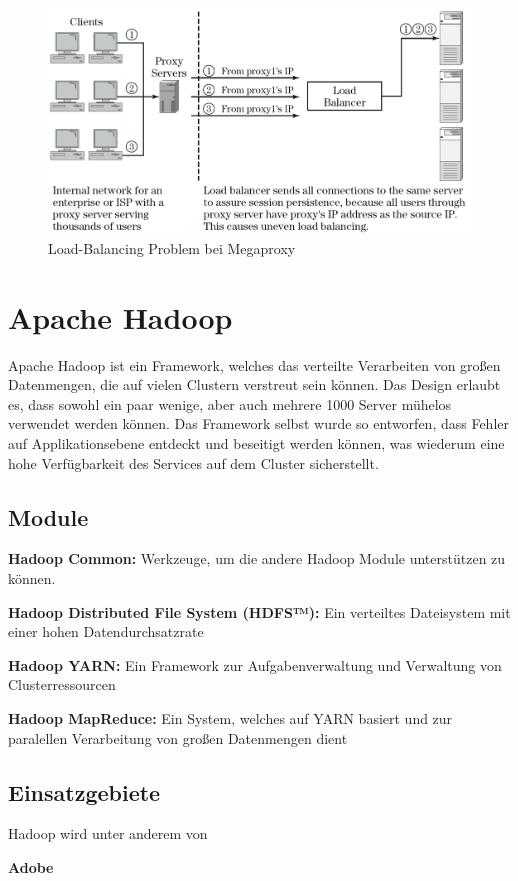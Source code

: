 \begin{figure}[!h]
	\begin{center}
		\includegraphics[width=0.5\linewidth]{images/MegaProxy2.png}
		\caption{Load-Balancing Problem bei Megaproxy \cite{LoadBalancing2}}
		\label{Load-Balancing_Problem_bei_Megaproxy}
	\end{center}
\end{figure}

\section{Apache Hadoop}
\label{sec:Apache Hadoop}
Apache Hadoop ist ein Framework, welches das verteilte Verarbeiten von großen Datenmengen, die auf vielen Clustern verstreut sein können. Das Design erlaubt es, dass sowohl ein paar wenige, aber auch mehrere 1000 Server mühelos verwendet werden können. Das Framework selbst wurde so entworfen, dass Fehler auf Applikationsebene entdeckt und beseitigt werden können, was wiederum eine hohe Verfügbarkeit des Services auf dem Cluster sicherstellt.

\subsection{Module}
\label{sec:Module}
\textbf{Hadoop Common:} Werkzeuge, um die andere Hadoop Module unterstützen zu können.

\textbf{Hadoop Distributed File System (HDFS™):} Ein verteiltes Dateisystem mit einer hohen Datendurchsatzrate

\textbf{Hadoop YARN:} Ein Framework zur Aufgabenverwaltung und Verwaltung von Clusterressourcen

\textbf{Hadoop MapReduce: } Ein System, welches auf YARN basiert und zur paralellen Verarbeitung von großen Datenmengen dient

\subsection{Einsatzgebiete}
\label{sec:Einsatzgebiete}
Hadoop wird unter anderem von

\textbf{Adobe}


